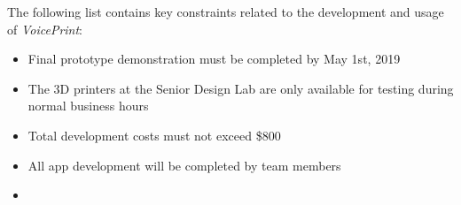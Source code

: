 The following list contains key constraints related to the development and usage of \textit{VoicePrint}:

\begin{itemize}
  \item Final prototype demonstration must be completed by May 1st, 2019
  \item The 3D printers at the Senior Design Lab are only available for testing during normal business hours
  \item Total development costs must not exceed \$800
  \item All app development will be completed by team members
  \item 
\end{itemize}